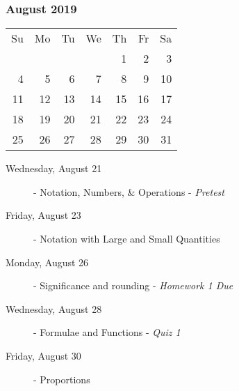 \subsubsection*{August 2019}
\begin{tabular}{rrrrrrr}
Su & Mo & Tu & We & Th & Fr & Sa\\
   &    &    &    &  1 &  2 &  3\\
 4 &  5 &  6 &  7 &  8 &  9 & 10\\
11 & 12 & 13 & 14 & 15 & 16 & 17\\
18 & 19 & 20 & 21 & 22 & 23 & 24\\
25 & 26 & 27 & 28 & 29 & 30 & 31\\
\end{tabular}

\begin{description}
\item[Wednesday, August 21] 
  - Notation, Numbers, \& Operations - {\em Pretest}
\item[Friday, August 23] 
  - Notation with Large and Small Quantities
\item[Monday, August 26]
  - Significance and rounding - {\em Homework 1 Due}
\item[Wednesday, August 28]
  - Formulae and Functions - {\em Quiz 1}
\item[Friday, August 30]
  - Proportions
\end{description}
\hrulefill

